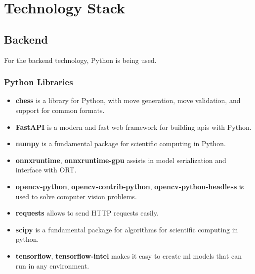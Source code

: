 \section{Technology Stack}
\label{sec:technology-stack}

\subsection{Backend}
\label{subsec:backend}

For the backend technology, Python is being used.

\subsubsection*{Python Libraries}
\label{subsubsec:python-libraries}

\begin{itemize}
    \item \textbf{chess} is a library for Python, with move generation, move validation, and support for common formats. \cite{python:chess}
    
    \item \textbf{FastAPI} is a modern and fast web framework for building \Glspl{api} with Python. \cite{python:fastapi}
    
    \item \textbf{numpy} is a fundamental package for scientific computing in Python. \cite{python:numpy}
    
    \item \textbf{onnxruntime}, \textbf{onnxruntime-gpu} assists in model serialization and interface with ORT. \cite{python:onnx}
    
    \item \textbf{opencv-python}, \textbf{opencv-contrib-python}, \textbf{opencv-python-headless} is used to solve computer vision problems. \cite{python:opencv}
    
    \item \textbf{requests} allows to send HTTP requests easily. \cite{python:requests}
    
    \item \textbf{scipy} is a fundamental package for algorithms for scientific computing in python. \cite{python:scipy}
    
    \item \textbf{tensorflow}, \textbf{tensorflow-intel} makes it easy to create \gls{ml} models that can run in any environment. \cite{python:tensorflow}
\end{itemize}

